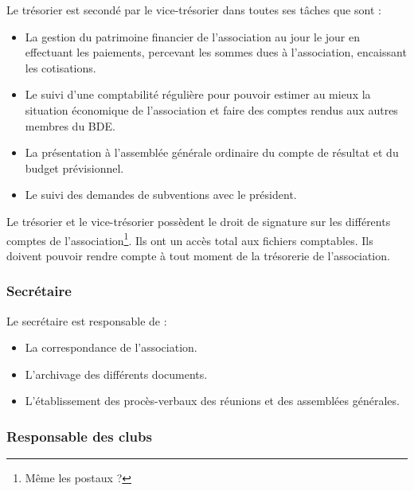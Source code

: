 \documentclass{article} %
\begin{document}
				Le trésorier est secondé par le vice-trésorier dans toutes ses
				tâches que sont :
				\begin{itemize}
					\item La gestion du patrimoine financier de l’association au
						jour le jour en effectuant les paiements, percevant les
						sommes dues à l’association, encaissant les cotisations.
					\item Le suivi d’une comptabilité régulière pour pouvoir
						estimer au mieux la situation économique de
						l’association et faire des comptes rendus aux autres
						membres du BDE.
					\item La présentation à l’assemblée générale ordinaire du
						compte de résultat et du budget prévisionnel.
					\item Le suivi des demandes de subventions avec le
						président.
				\end{itemize}

				Le trésorier et le vice-trésorier possèdent le droit de
				signature sur les différents comptes de
				l'association\footnote{Même les postaux ?}. Ils ont un accès
				total aux fichiers comptables. Ils doivent pouvoir rendre compte
				à tout moment de la trésorerie de l’association.

			\subsubsection{Secrétaire}

				Le secrétaire est responsable de :
				\begin{itemize}
					\item La correspondance de l’association.
					\item L’archivage des différents documents.
					\item L’établissement des procès-verbaux des réunions et des
						assemblées générales.
				\end{itemize}

			\subsubsection{Responsable des clubs}
\end{document}
